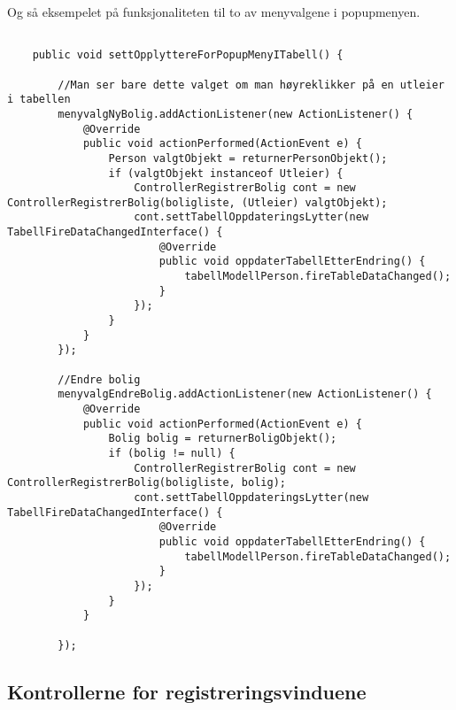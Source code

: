 Og så eksempelet på funksjonaliteten til to av menyvalgene i popupmenyen.
\begin{lstlisting}[caption=Funksjonalitet for to av popupmenyens valg]

    public void settOpplyttereForPopupMenyITabell() {

        //Man ser bare dette valget om man høyreklikker på en utleier i tabellen
        menyvalgNyBolig.addActionListener(new ActionListener() {
            @Override
            public void actionPerformed(ActionEvent e) {
                Person valgtObjekt = returnerPersonObjekt();
                if (valgtObjekt instanceof Utleier) {
                    ControllerRegistrerBolig cont = new ControllerRegistrerBolig(boligliste, (Utleier) valgtObjekt);
                    cont.settTabellOppdateringsLytter(new TabellFireDataChangedInterface() {
                        @Override
                        public void oppdaterTabellEtterEndring() {
                            tabellModellPerson.fireTableDataChanged();
                        }
                    });
                }
            }
        });

        //Endre bolig
        menyvalgEndreBolig.addActionListener(new ActionListener() {
            @Override
            public void actionPerformed(ActionEvent e) {
                Bolig bolig = returnerBoligObjekt();
                if (bolig != null) {
                    ControllerRegistrerBolig cont = new ControllerRegistrerBolig(boligliste, bolig);
                    cont.settTabellOppdateringsLytter(new TabellFireDataChangedInterface() {
                        @Override
                        public void oppdaterTabellEtterEndring() {
                            tabellModellPerson.fireTableDataChanged();
                        }
                    });
                }
            }

        });

\end{lstlisting}




\subsection{Kontrollerne for registreringsvinduene} \label{sec:regkontrollere}


